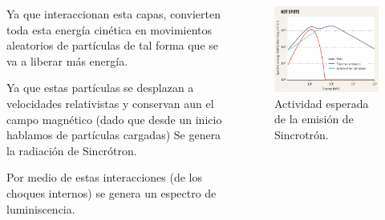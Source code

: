 \documentclass{beamer}
\begin{document}
\begin{frame}
	\begin{columns}
		\begin{column}{5cm}
		Ya que interaccionan esta capas, convierten toda esta energ\'ia cin\'etica
		en movimientos aleatorios de part\'iculas
		de tal forma que se va a liberar m\'as energ\'ia.
		
		Ya que estas part\'iculas se desplazan a 
		velocidades relativistas y conservan aun el campo magn\'etico (dado que desde un inicio hablamos de part\'iculas cargadas)
		Se genera la radiaci\'on de Sincr\'otron.
		
		Por medio de estas interacciones (de los choques internos) se genera un espectro 
		de luminiscencia.
		\end{column}
		
		\begin{column}{5cm}
			\begin{figure}
				\centering
				\includegraphics[scale=0.15]{grb-spectrum1.jpg}
				\caption{Actividad esperada de la emisi\'on de Sincrotr\'on.}
			\end{figure}
		\end{column}	
	\end{columns}
\end{frame}


\end{document}
